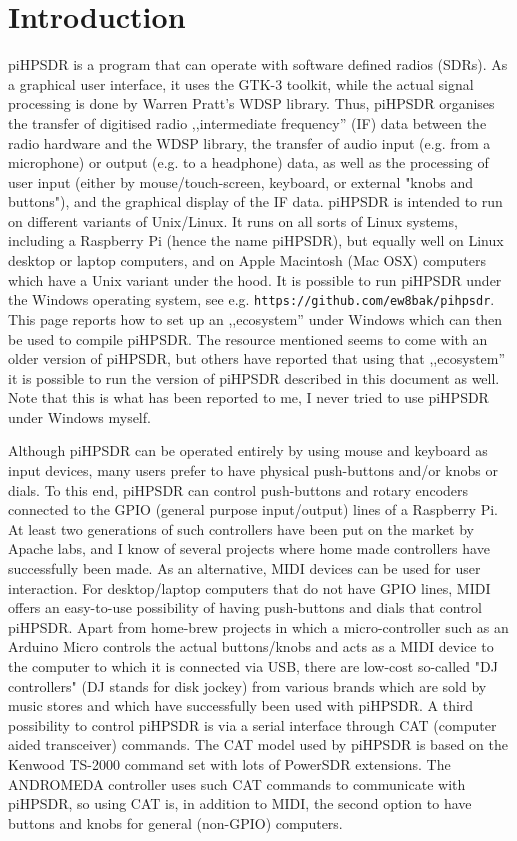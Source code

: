 \documentclass[12pt]{book}
\def\pH{pi\-HPSDR\xspace}
\begin{document}
\chapter{Introduction}
\pH is a program that can operate with software defined radios (SDRs). As a graphical user interface,
it uses the GTK-3 toolkit, while the actual signal processing is done by Warren Pratt's WDSP library. Thus,
\pH organises the transfer of digitised radio ,,intermediate frequency'' (IF)
data between the radio hardware and the
WDSP library, the
transfer of audio input (e.g. from a microphone) or output (e.g. to a headphone) data,
 as well as the processing of user
input (either by mouse/touch-screen, keyboard, or external "knobs and buttons"),
 and the graphical display of the IF data. \pH is intended
to run on different variants of Unix/Linux. It runs on all sorts of Linux systems,
including a Raspberry Pi (hence
the name \pH), but equally well on Linux desktop or laptop computers, and on Apple Macintosh (Mac OSX)
computers which have a Unix variant under the hood.
It is possible to run
piHPSDR under the Windows operating system, see e.g. \texttt{https://github.com/ew8bak/pihpsdr}.
This page reports how to set up an ,,ecosystem'' under Windows which can then be used to compile
\pH. The resource mentioned seems to come with an older version of \pH, but others have reported
that using that ,,ecosystem'' it is possible to run the version of \pH described in this document
as well. Note that this is what has been reported to me, I never tried to use \pH under Windows
myself.


Although \pH can be operated entirely by using mouse and keyboard as input devices, many users prefer to
have physical push-buttons and/or knobs or dials. To this end, \pH can control push-buttons and rotary
encoders connected to the GPIO (general purpose input/output)
lines of a Raspberry Pi. At least two generations of such controllers have
been put on the market by Apache labs, and I know of several projects where home made controllers have
successfully been made. As an alternative, MIDI devices can be used for user interaction. For desktop/laptop
computers that do not have GPIO lines, MIDI offers an easy-to-use possibility of having push-buttons and
dials that control \pH. Apart from home-brew projects in which a micro-controller such as an Arduino
Micro controls the actual buttons/knobs and acts as a MIDI device to the computer to which it is connected
via USB, there are low-cost so-called "DJ controllers" (DJ stands for disk jockey) from various brands
which are sold by music stores and
which
have successfully been used with \pH. A third possibility to control \pH is via a serial interface
through CAT (computer aided transceiver) commands. The CAT model used by \pH is based on the Kenwood
TS-2000 command set with lots of PowerSDR extensions. The ANDROMEDA controller uses such CAT commands to
communicate with piHPSDR, so using CAT is, in addition to MIDI, the second option to have buttons and knobs
for general (non-GPIO) computers.
\end{document}
